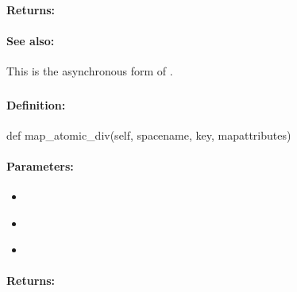 \paragraph{Returns:}


\paragraph{See also:}  This is the asynchronous form of .

\pagebreak
\subsubsection{}
\label{api:python:map_atomic_div}


\paragraph{Definition:}
\begin{pythoncode}
def map_atomic_div(self, spacename, key, mapattributes)
\end{pythoncode}

\paragraph{Parameters:}
\begin{itemize}[noitemsep]
\item {}\\

\item {}\\

\item {}\\

\end{itemize}

\paragraph{Returns:}


\pagebreak
\subsubsection{}
\label{api:python:async_map_atomic_div}


